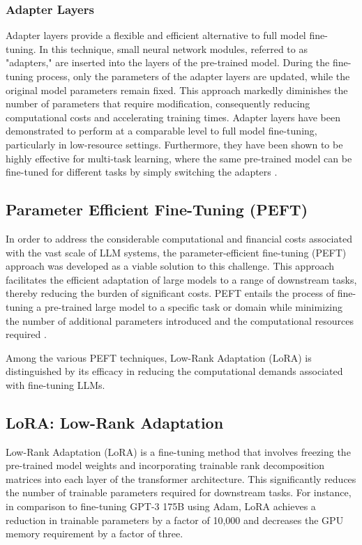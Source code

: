 \subsubsection{Adapter Layers}

Adapter layers provide a flexible and efficient alternative to full model fine-tuning. In this technique, small neural network modules, referred to as "adapters," are inserted into the layers of the pre-trained model. During the fine-tuning process, only the parameters of the adapter layers are updated, while the original model parameters remain fixed. This approach markedly diminishes the number of parameters that require modification, consequently reducing computational costs and accelerating training times. Adapter layers have been demonstrated to perform at a comparable level to full model fine-tuning, particularly in low-resource settings. Furthermore, they have been shown to be highly effective for multi-task learning, where the same pre-trained model can be fine-tuned for different tasks by simply switching the adapters \cite{houlsby2019parameter}.

\subsection{Parameter Efficient Fine-Tuning (PEFT)}

In order to address the considerable computational and financial costs associated with the vast scale of LLM systems, the parameter-efficient fine-tuning (PEFT) approach was developed as a viable solution to this challenge. This approach facilitates the efficient adaptation of large models to a range of downstream tasks, thereby reducing the burden of significant costs. PEFT entails the process of fine-tuning a pre-trained large model to a specific task or domain while minimizing the number of additional parameters introduced and the computational resources required \cite{han2024parameter}.

Among the various PEFT techniques, Low-Rank Adaptation (LoRA) is distinguished by its efficacy in reducing the computational demands associated with fine-tuning LLMs.

\subsection{LoRA: Low-Rank Adaptation}

Low-Rank Adaptation (LoRA) is a fine-tuning method that involves freezing the pre-trained model weights and incorporating trainable rank decomposition matrices into each layer of the transformer architecture. This significantly reduces the number of trainable parameters required for downstream tasks. For instance, in comparison to fine-tuning GPT-3 175B using Adam, LoRA achieves a reduction in trainable parameters by a factor of 10,000 and decreases the GPU memory requirement by a factor of three.

